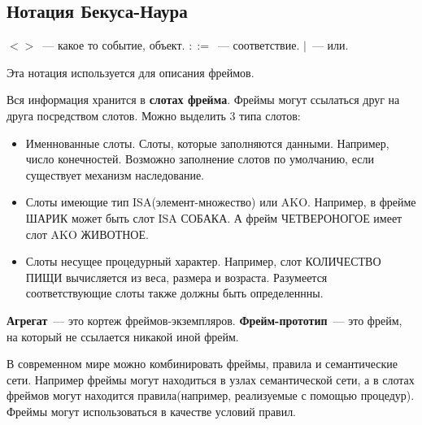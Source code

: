 \subsection{Нотация Бекуса-Наура}
$<>$~--- какое то событие, объект. $::=$~--- соответствие. $|$~--- или.

Эта нотация используется для описания фреймов. 

Вся информация хранится в \textbf{слотах фрейма}. Фреймы могут ссылаться друг на друга посредством слотов. Можно выделить 3 типа слотов:
\begin{itemize}
	\item Именнованные слоты. Слоты, которые заполняются данными. Например, число конечностей. Возможно заполнение слотов по умолчанию, если существует механизм наследование.
	\item Слоты имеющие тип ISA(элемент-множество) или AKO. Например, в фрейме ШАРИК может быть слот ISA СОБАКА. А фрейм ЧЕТВЕРОНОГОЕ имеет слот AKO ЖИВОТНОЕ.
	\item Слоты несущее процедурный характер. Например, слот КОЛИЧЕСТВО ПИЩИ вычисляется из веса, размера и возраста. Разумеется соответствующие слоты также должны быть определеннны.
\end{itemize}

\textbf{Агрегат}~--- это кортеж фреймов-экземпляров. \textbf{Фрейм-прототип}~--- это фрейм, на который не ссылается никакой иной фрейм.

В современном мире можно комбинировать фреймы, правила и семантические сети. Например фреймы могут находиться в узлах семантической сети, а в слотах фреймов могут находится правила(например, реализуемые с помощью процедур). Фреймы могут использоваться в качестве условий правил.

